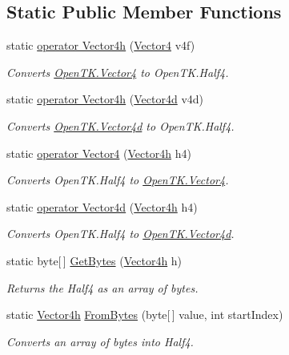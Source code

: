 \subsection*{Static Public Member Functions}
\begin{DoxyCompactItemize}
\item 
static \hyperlink{struct_open_t_k_1_1_vector4h_a157bb351ac7ede97f7f75d7fbc7bc57a}{operator Vector4h} (\hyperlink{struct_open_t_k_1_1_vector4}{Vector4} v4f)
\begin{DoxyCompactList}\small\item\em Converts \hyperlink{struct_open_t_k_1_1_vector4}{Open\-T\-K.\-Vector4} to Open\-T\-K.\-Half4.\end{DoxyCompactList}\item 
static \hyperlink{struct_open_t_k_1_1_vector4h_aab8be2c031432665faf84e47c6ddc69e}{operator Vector4h} (\hyperlink{struct_open_t_k_1_1_vector4d}{Vector4d} v4d)
\begin{DoxyCompactList}\small\item\em Converts \hyperlink{struct_open_t_k_1_1_vector4d}{Open\-T\-K.\-Vector4d} to Open\-T\-K.\-Half4.\end{DoxyCompactList}\item 
static \hyperlink{struct_open_t_k_1_1_vector4h_aa087af343bc02565641e349139de388e}{operator Vector4} (\hyperlink{struct_open_t_k_1_1_vector4h}{Vector4h} h4)
\begin{DoxyCompactList}\small\item\em Converts Open\-T\-K.\-Half4 to \hyperlink{struct_open_t_k_1_1_vector4}{Open\-T\-K.\-Vector4}.\end{DoxyCompactList}\item 
static \hyperlink{struct_open_t_k_1_1_vector4h_a15723fe1af9db523c50654f168332c85}{operator Vector4d} (\hyperlink{struct_open_t_k_1_1_vector4h}{Vector4h} h4)
\begin{DoxyCompactList}\small\item\em Converts Open\-T\-K.\-Half4 to \hyperlink{struct_open_t_k_1_1_vector4d}{Open\-T\-K.\-Vector4d}.\end{DoxyCompactList}\item 
static byte\mbox{[}$\,$\mbox{]} \hyperlink{struct_open_t_k_1_1_vector4h_a529b9480bb1f1410839559676f8bd33e}{Get\-Bytes} (\hyperlink{struct_open_t_k_1_1_vector4h}{Vector4h} h)
\begin{DoxyCompactList}\small\item\em Returns the Half4 as an array of bytes.\end{DoxyCompactList}\item 
static \hyperlink{struct_open_t_k_1_1_vector4h}{Vector4h} \hyperlink{struct_open_t_k_1_1_vector4h_af177d7409f4186843929c427a72093db}{From\-Bytes} (byte\mbox{[}$\,$\mbox{]} value, int start\-Index)
\begin{DoxyCompactList}\small\item\em Converts an array of bytes into Half4.\end{DoxyCompactList}\end{DoxyCompactItemize}
